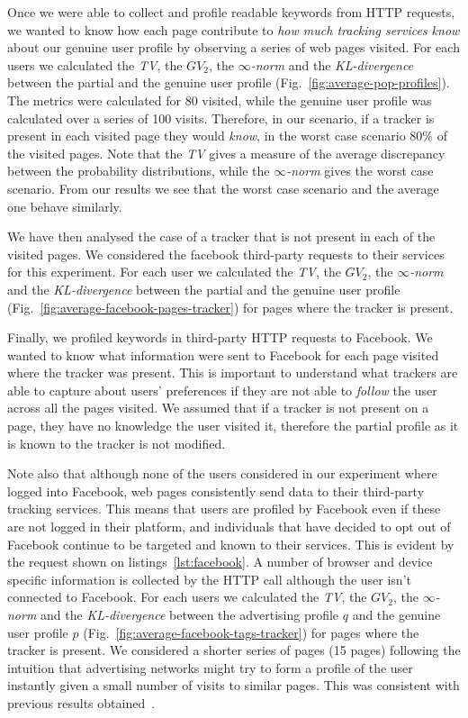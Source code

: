 Once we were able to collect and profile readable keywords from HTTP requests, we wanted to know how each page contribute to \emph{how much tracking services know} about our genuine user profile by observing a series of web pages visited.
For each users we calculated the \emph{TV}, the \emph{$GV_2$}, the \emph{$\infty$-norm} and the \emph{KL-divergence} between the partial and the genuine user profile (Fig.~\ref{fig:average-pop-profiles}).
The metrics were calculated for 80 visited, while the genuine user profile was calculated over a series of 100 visits. Therefore, in our scenario, if a tracker is present in each visited page they would \emph{know}, in the worst case scenario 80\% of the visited pages.
Note that the \emph{TV} gives a measure of the average discrepancy between the probability distributions, while the \emph{$\infty$-norm} gives the worst case scenario. From our results we see that the worst case scenario and the average one behave similarly.

We have then analysed the case of a tracker that is not present in each of the visited pages. We considered the facebook third-party requests to their services for this experiment. For each user we calculated the \emph{TV}, the \emph{$GV_2$}, the \emph{$\infty$-norm} and the \emph{KL-divergence} between the partial and the genuine user profile (Fig.~\ref{fig:average-facebook-pages-tracker}) for pages where the tracker is present.

Finally, we profiled keywords in third-party HTTP requests to Facebook. We wanted to know what information were sent to Facebook for each page visited where the tracker was present. This is important to understand what trackers are able to capture about users' preferences if they are not able to \emph{follow} the user across all the pages visited. We assumed that if a tracker is not present on a page, they have no knowledge the user visited it, therefore the partial profile as it is known to the tracker is not modified.

Note also that although none of the users considered in our experiment where logged into Facebook, web pages consistently send data to their third-party tracking services. This means that users are profiled by Facebook even if these are not logged in their platform, and individuals that have decided to opt out of Facebook continue to be targeted and known to their services. This is evident by the request shown on listings~\ref{lst:facebook}. A number of browser and device specific information is collected by the HTTP call although the user isn't connected to Facebook. For each users we calculated the \emph{TV}, the \emph{$GV_2$}, the \emph{$\infty$-norm} and the \emph{KL-divergence} between the advertising profile $q$ and the genuine user profile $p$ (Fig.~\ref{fig:average-facebook-tags-tracker}) for pages where the tracker is present. We considered a shorter series of pages (15 pages) following the intuition that advertising networks might try to form a profile of the user instantly given a small number of visits to similar pages. This was consistent with previous results obtained~\cite{puglisi2015you}.

